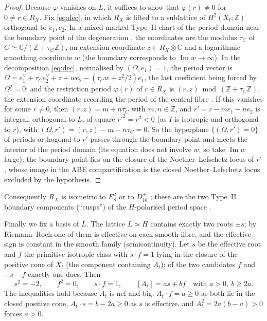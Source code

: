 \documentclass[12pt]{article}
\newcommand{\Z}{\mathbb Z}
\newcommand{\C}{\mathbb C}
\theoremstyle{definition}
\theoremstyle{remark}
\begin{document}
\begin{proof}
Because \(\varphi\) vanishes on \(L\), it suffices to show that
\(\varphi(r)\neq0\) for \(0\neq r\in R_X\). Fix \eqref{eq:dec}, in
which \(R_X\) is lifted to a sublattice of \(H^2(X_t;\Z)\) orthogonal
to \(e_1,e_2\).
In a mixed-marked Type~II chart of the period domain near the
boundary point of the degeneration \cite[Theorem~7.1]{AE}, the
coordinates are the modulus \(\tau_C\) of \(C\simeq\C/(\Z+\tau_C\Z)\),
an extension coordinate \(z\in R_X\otimes\C\) and a logarithmic
smoothing coordinate \(w\) (the boundary corresponds to
\(\operatorname{Im}w\to\infty\)). In the decomposition \eqref{eq:dec},
normalised by \((\Omega,e_1)=1\), the period vector is
\(\Omega=e_1^\vee+\tau_Ce_2^\vee+z+we_2-(\tau_Cw+z^2/2)e_1\), the last
coefficient being forced by \(\Omega^2=0\); and the restriction period
\(\varphi(r)\) of \(r\in R_X\) is \((r,z)\bmod(\Z+\tau_C\Z)\), the
extension coordinate recording the period of the central fibre
\cite[Construction~4.3, Proposition~4.13]{AE}.
If this vanishes for some \(r\neq0\), then \((r,z)=m+n\tau_C\) with
\(m,n\in\Z\), and \(r'=r-me_1-ne_2\) is integral, orthogonal to \(L\),
of square \(r'^2=r^2<0\) (as \(I\) is isotropic and orthogonal to
\(r\)), with \((\Omega,r')=(r,z)-m-n\tau_C=0\). So the hyperplane
\(\{(\Omega,r')=0\}\) of periods orthogonal to \(r'\) passes through
the boundary point and meets the interior of the period domain (its
equation does not involve \(w\), so take \(\operatorname{Im}w\)
large): the boundary point lies on the
closure of the Noether--Lefschetz locus of \(r'\), whose image in the
ABE compactification is the closed Noether--Lefschetz locus excluded
by the hypothesis.
\end{proof}

Consequently \(R_X\) is isometric to \(E_8^2\) or to \(D_{16}^+\)
\cite[\S8]{Se}; these are the two Type~II boundary components
(``cusps'') of the \(H\)-polarised period space
\cite[\S7F, Theorem~7.58]{ABE}.

Finally we fix a basis of \(L\). The lattice \(L\simeq H\) contains
exactly two roots \(\pm s\); by
Riemann--Roch one of them is effective on each smooth fibre, and the
effective sign is constant in the smooth family (semicontinuity). Let
\(s\) be the effective root and \(f\) the primitive isotropic class
with \(s\cdot f=1\) lying in the closure of the positive cone of
\(X_t\) (the component containing \(A_t\)); of the two candidates
\(f\) and \(-s-f\) exactly one does. Then
\begin{equation}\label{eq:ab}
 s^2=-2,\qquad f^2=0,\qquad s\cdot f=1,\qquad
 [A_t]=as+bf\quad\text{with } a>0,\ b\geq2a .
\end{equation}
The inequalities hold because \(A_t\) is nef and big:
\(A_t\cdot f=a\geq0\) as both lie in the closed positive cone,
\(A_t\cdot s=b-2a\geq0\) as \(s\) is effective, and
\(A_t^2=2a(b-a)>0\) forces \(a>0\).
\end{document}
